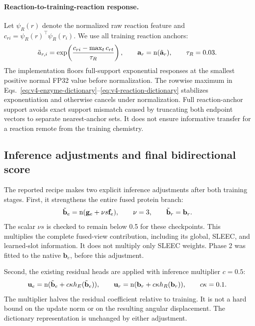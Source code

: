 \paragraph{Reaction-to-training-reaction response.}
Let $\psi_R(r)$ denote the normalized raw reaction feature and
$c_{ri}=\psi_R(r)^\top\psi_R(r_i)$. We use all training reaction anchors:
\begin{equation}
  \tilde a_{r,i}=\exp\!\left(
       \frac{c_{ri}-\max_t c_{rt}}{\tau_R}\right),\qquad
  \mathbf{a}_r=\operatorname{n}(\tilde{\mathbf{a}}_r),\qquad \tau_R=0.03.
  \label{eq:v4-reaction-dictionary}
\end{equation}
The implementation floors full-support exponential responses at the smallest
positive normal FP32 value before normalization. The rowwise maximum in
Eqs.~\eqref{eq:v4-enzyme-dictionary}--\eqref{eq:v4-reaction-dictionary}
stabilizes exponentiation and otherwise cancels under normalization.
Full reaction-anchor support avoids exact support mismatch caused by truncating
both endpoint vectors to separate nearest-anchor sets. It does not ensure
informative transfer for a reaction remote from the training chemistry.

\subsection{Inference adjustments and final bidirectional score}
\label{sec:v4-inference}
The reported recipe makes two explicit inference adjustments after both
training stages. First, it strengthens the entire fused protein branch:
\begin{equation}
  \tilde{\mathbf{b}}_e=\operatorname{n}(\mathbf{g}_e+\nu s \mathbf{f}_e),\qquad \nu=3,
  \qquad \tilde{\mathbf{b}}_r=\mathbf{b}_r.
  \label{eq:v4-inference-fusion}
\end{equation}
The scalar $\nu s$ is checked to remain below 0.5 for these checkpoints.
This multiplies the complete fused-view contribution, including its global,
SLEEC, and learned-slot information. It does not multiply only SLEEC weights.
Phase 2 was fitted to the native $\mathbf{b}_e$, before this adjustment.

Second, the existing residual heads are applied with inference multiplier
$c=0.5$:
\begin{equation}
  \mathbf{u}_e=\operatorname{n}(\tilde{\mathbf{b}}_e+c\kappa h_E(\tilde{\mathbf{b}}_e)),\qquad
  \mathbf{u}_r=\operatorname{n}(\mathbf{b}_r+c\kappa h_R(\mathbf{b}_r)),\qquad c\kappa=0.1.
  \label{eq:v4-inference-residual}
\end{equation}
The multiplier halves the residual coefficient relative to training. It is
not a hard bound on the update norm or on the resulting angular displacement.
The dictionary representation is unchanged by either adjustment.

